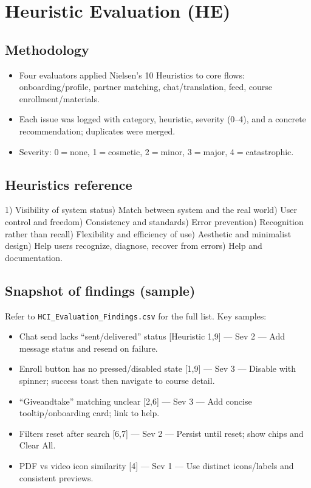 \documentclass[11pt,a4paper]{article}
\begin{document}
\section{Heuristic Evaluation (HE)}

\subsection{Methodology}
\begin{itemize}[leftmargin=*]
  \item Four evaluators applied Nielsen’s 10 Heuristics to core flows: onboarding/profile, partner matching, chat/translation, feed, course enrollment/materials.
  \item Each issue was logged with category, heuristic, severity (0--4), and a concrete recommendation; duplicates were merged.
  \item Severity: 0$=$none, 1$=$cosmetic, 2$=$minor, 3$=$major, 4$=$catastrophic.
\end{itemize}

\subsection{Heuristics reference}
1) Visibility of system status) Match between system and the real world) User control and freedom) Consistency and standards) Error prevention) Recognition rather than recall) Flexibility and efficiency of use) Aesthetic and minimalist design) Help users recognize, diagnose, recover from errors) Help and documentation.

\subsection{Snapshot of findings (sample)}
Refer to \texttt{HCI\_Evaluation\_Findings.csv} for the full list. Key samples:
\begin{itemize}[leftmargin=*]
  \item Chat send lacks ``sent/delivered'' status [Heuristic 1,9] --- Sev 2 --- Add message status and resend on failure.
  \item Enroll button has no pressed/disabled state [1,9] --- Sev 3 --- Disable with spinner; success toast then navigate to course detail.
  \item ``Give\-and\-take'' matching unclear [2,6] --- Sev 3 --- Add concise tooltip/onboarding card; link to help.
  \item Filters reset after search [6,7] --- Sev 2 --- Persist until reset; show chips and Clear All.
  \item PDF vs video icon similarity [4] --- Sev 1 --- Use distinct icons/labels and consistent previews.
\end{itemize}
\end{document}
